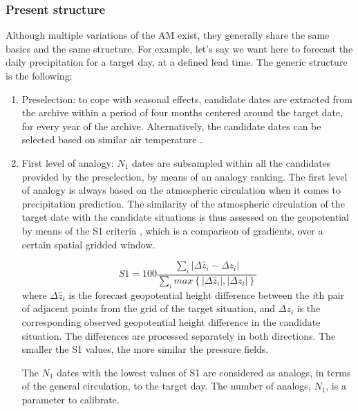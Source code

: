 \documentclass[review]{elsarticle}
\begin{document}
\subsubsection{Present structure}

Although multiple variations of the AM exist, they generally share the same basics and the same structure. For example, let's say we want here to forecast the daily precipitation for a target day, at a defined lead time. The generic structure is the following:

\begin{enumerate}
	\item Preselection: to cope with seasonal effects, candidate dates are extracted from the archive within a period of four months centered around the target date, for every year of the archive. Alternatively, the candidate dates can be selected based on similar air temperature \citep{BenDaoud2010}.
	
	\item First level of analogy: $N_{1}$ dates are subsampled within all the candidates provided by the preselection, by means of an analogy ranking. The first level of analogy is always based on the atmospheric circulation when it comes to precipitation prediction. The similarity of the atmospheric circulation of the target date with the candidate situations is thus assessed on the geopotential by means of the S1 criteria \citep[Eq. (\ref{eq:S1}), ][see also Sect. \ref{sec:method:references}]{Teweles1954, Drosdowsky2003}, which is a comparison of gradients, over a certain spatial gridded window.
	
	\begin{equation}
	\label{eq:S1}
	S1=100 \frac {\displaystyle \sum_{i} \vert \Delta\hat{z}_{i} - \Delta z_{i} \vert}
	{\displaystyle \sum_{i} max\left\lbrace \vert \Delta\hat{z}_{i} \vert , \vert \Delta z_{i} \vert \right\rbrace }
	\end{equation}
	where $\Delta \hat{z}_{i}$ is the forecast geopotential height difference between the \textit{i}th pair of adjacent points from the grid of the target situation, and $\Delta z_{i}$ is the corresponding observed geopotential height difference in the candidate situation. The differences are processed separately in both directions. The smaller the S1 values, the more similar the pressure fields.
	
	The $N_{1}$ dates with the lowest values of S1 are considered as analogs, in terms of the general circulation, to the target day. The number of analogs, $N_{1}$, is a parameter to calibrate.
	

\end{enumerate}
\end{document}
